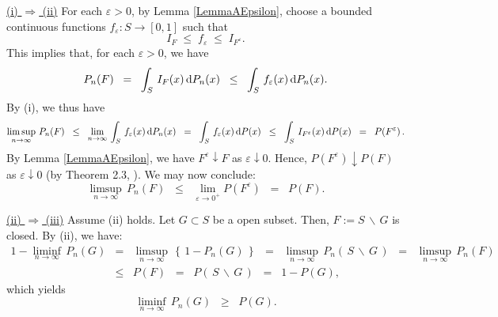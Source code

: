 \proof
\vskip 0.3cm
\noindent
\underline{(i) $\Longrightarrow$ (ii)}
\vskip 0.2cm
\noindent
For each $\varepsilon > 0$, by Lemma \ref{LemmaAEpsilon}, choose
a bounded continuous functions $f_{\varepsilon} : S \longrightarrow [0,1]$ such that
\begin{equation*}
I_{F} \; \leq \; f_{\varepsilon} \; \leq \; I_{F^{\varepsilon}}.
\end{equation*}
This implies that, for each $\varepsilon > 0$, we have
\begin{equation*}
P_{n}(F)
\;\; = \;\; \int_{S}\,I_{F}(x)\,\textnormal{d} P_{n}(x)
\;\; \leq \;\; \int_{S}\,f_{\varepsilon}(x)\,\textnormal{d} P_{n}(x).
\end{equation*}
By (i), we thus have
\begin{equation*}
\limsup_{n\rightarrow\infty}\,P_{n}(F)
\;\;\leq\;\; \lim_{n\rightarrow\infty}\,\int_{S}\,f_{\varepsilon}(x)\,\textnormal{d} P_{n}(x)
\;\;=\;\; \int_{S}\,f_{\varepsilon}(x)\,\textnormal{d} P(x)
\;\;\leq\;\; \int_{S}\,I_{F^{\varepsilon}}(x)\,\textnormal{d} P(x)
\;\;=\;\; P\!\left(F^{\varepsilon}\right).
\end{equation*}
By Lemma \ref{LemmaAEpsilon}, we have $F^{\varepsilon}\downarrow F$ as $\varepsilon\downarrow 0$.
Hence, $P\!\left(F^{\varepsilon}\right)\downarrow P(F)$ as $\varepsilon\downarrow 0$ (by Theorem 2.3, \cite{JacodProtter}).
We may now conclude:
\begin{equation*}
\limsup_{n\rightarrow\infty}\,P_{n}(F)
\;\;\leq\;\; \lim_{\varepsilon\rightarrow 0^{+}}P\!\left(F^{\varepsilon}\right)
\;\;=\;\; P\!\left(F\right).
\end{equation*}

\vskip 0.3cm
\noindent
\underline{(ii) $\Longrightarrow$ (iii)}
\vskip 0.2cm
\noindent
Assume (ii) holds. Let $G \subset S$ be a open subset.
Then, $F := S\,\backslash\,G$ is closed. By (ii), we have:
\begin{eqnarray*}
1 - \liminf_{n\rightarrow\infty}\,P_{n}\!\left(G\right)
&=& \limsup_{n\rightarrow\infty}\,\left\{\,1 - P_{n}\!\left(G\right)\,\right\}
\;\;=\;\;\limsup_{n\rightarrow\infty}\,P_{n}\!\left(\,S\,\backslash\,G\,\right)
\;\;=\;\;\limsup_{n\rightarrow\infty}\,P_{n}(F)
\\
&\leq& P\!\left(F\right)
\;\;=\;\; P\!\left(\,S\,\backslash\,G\,\right)
\;\;=\;\; 1 - P\!\left(G\right),
\end{eqnarray*}
which yields
\begin{equation}
\liminf_{n\rightarrow\infty}\,P_{n}\!\left(G\right)
\;\;\geq\;\; P\!\left(G\right).
\end{equation}

